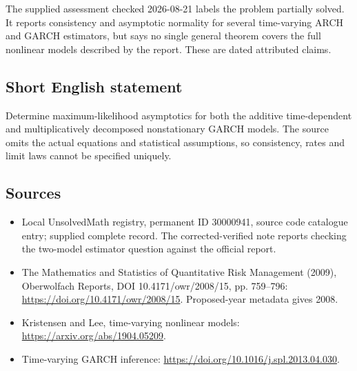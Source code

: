 \documentclass[11pt]{article}
\begin{document}
The supplied assessment checked 2026-08-21 labels the problem partially solved. It reports consistency and asymptotic normality for several time-varying ARCH and GARCH estimators, but says no single general theorem covers the full nonlinear models described by the report. These are dated attributed claims.
\subsection{Short English statement}
Determine maximum-likelihood asymptotics for both the additive time-dependent and multiplicatively decomposed nonstationary GARCH models. The source omits the actual equations and statistical assumptions, so consistency, rates and limit laws cannot be specified uniquely.
\subsection{Sources}
\begin{itemize}
\item Local UnsolvedMath registry, permanent ID 30000941, source code catalogue entry; supplied complete record. The corrected-verified note reports checking the two-model estimator question against the official report.
\item The Mathematics and Statistics of Quantitative Risk Management (2009), Oberwolfach Reports, DOI 10.4171/owr/2008/15, pp. 759--796: \url{https://doi.org/10.4171/owr/2008/15}. Proposed-year metadata gives 2008.
\item Kristensen and Lee, time-varying nonlinear models: \url{https://arxiv.org/abs/1904.05209}.
\item Time-varying GARCH inference: \url{https://doi.org/10.1016/j.spl.2013.04.030}.
\end{itemize}
\end{document}
